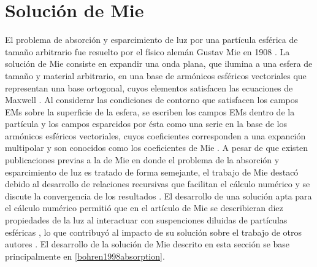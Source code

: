 \section{Solución de Mie}

El problema de absorción y esparcimiento de luz por una partícula esférica de tamaño arbitrario fue resuelto por el físico alemán Gustav Mie en 1908 \cite{mie1908metallosung}. La solución de Mie consiste en expandir una onda plana, que ilumina a una esfera de tamaño y material arbitrario, en una base de armónicos esféricos vectoriales que representan una base ortogonal, cuyos elementos satisfacen las ecuaciones de Maxwell \cite{bohren1998absorption}. Al considerar las condiciones de contorno que satisfacen los campos EMs sobre la superficie de la esfera, se escriben los campos EMs dentro de la partícula y los campos esparcidos por ésta como una serie en la base de los armónicos esféricos vectoriales, cuyos coeficientes corresponden a una expanción multipolar y son conocidos como los coeficientes de Mie \cite{bohren1998absorption}. A pesar de que existen publicaciones previas a la de Mie en donde  el problema de la absorción y esparcimiento de luz es tratado de forma semejante, el trabajo de Mie destacó debido al desarrollo de relaciones recursivas que facilitan el cálculo numérico y se discute la convergencia de los resultados \cite{horvath2009historic}. El desarrollo de una solución apta para el cálculo numérico permitió que en el artículo de Mie se describieran diez propiedades de la luz al interactuar con suspenciones diluidas de partículas esféricas \cite{mie1908metallosung}, lo que contribuyó al impacto de su solución sobre el trabajo de otros autores \cite{horvath2009historic}. El desarrollo de la solución de Mie descrito en esta sección se base principalmente en \ref{bohren1998absorption}.

